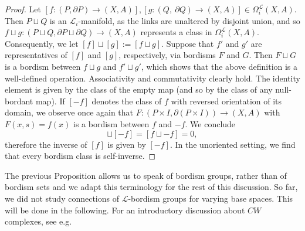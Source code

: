 \documentclass{scrreprt}
\begin{document}
\begin{proof}
Let $[f: (P, \partial P) \to (X,A)], [g: (Q,\ \partial Q) \to (X,A)] \in \Omega_i^{\mathcal{L}}(X,A)$. Then $P \sqcup Q$ is an $\mathcal{L}_i$-manifold, as the links are unaltered by disjoint union, and so $f \sqcup g: (P \sqcup Q, \partial P \sqcup \partial Q) \to (X,A)$ represents a class in $\Omega_i^{\mathcal{L}}(X,A)$. Consequently, we let $[f] \sqcup [g]:= [f \sqcup g]$. Suppose that $f'$ and $g'$ are representatives of $[f]$ and $[g]$, respectively, via bordisms $F$ and $G$. Then $F \sqcup G$ is a bordism between $f \sqcup g$ and $f' \sqcup g'$, which shows that the above definition is a well-defined operation. Associativity and commutativity clearly hold. The identity element is given by the class of the empty map (and so by the class of any null-bordant map). If $[-f]$ denotes the class of $f$ with reversed orientation of its domain, we observe once again that $F: (P \times I, \partial(P \times I)) \to (X,A)$ with $F(x,s)=f(x)$ is a bordism between $f$ and $-f$. We conclude
\begin{equation*}
[f] \sqcup [-f] = [f \sqcup -f] = 0 ,
\end{equation*}
therefore the inverse of $[f]$ is given by $[-f]$. In the unoriented setting, we find that every bordism class is self-inverse.
\end{proof}

The previous Proposition allows us to speak of bordism groups, rather than of bordism sets and we adapt this terminology for the rest of this discussion. \newline So far, we did not study connections of $\mathcal{L}$-bordism groups for varying base spaces. This will be done in the following. For an introductory discussion about $CW$ complexes, see \cite{hatcher} e.g.
\end{document}
